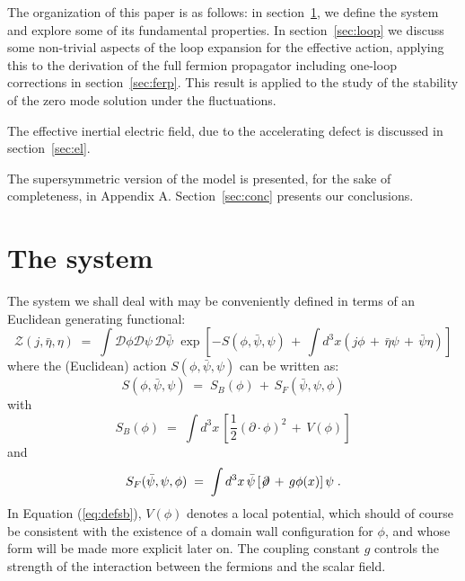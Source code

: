 \documentclass[a4paper,12pt]{article}
\begin{document}
The organization of this paper is as follows: in
section~\ref{sec:thesyst}, we define the system and explore some of
its fundamental properties. In section~\ref{sec:loop} we discuss some
non-trivial aspects of the loop expansion for the effective action,
applying this to the derivation of the full fermion propagator
including one-loop corrections in section~\ref{sec:ferp}. This result is
applied to the study of the stability of the zero mode solution under the
fluctuations. 

The effective inertial electric field, due to the accelerating defect
is discussed in section~\ref{sec:el}.

The supersymmetric version of the model is presented, for the sake of
completeness, in Appendix A. 
Section~\ref{sec:conc} presents our conclusions.

\section{The system}\label{sec:thesyst}
The system we shall deal with may be conveniently defined in terms of an 
Euclidean generating functional:
\begin{equation}
  \label{eq:defzgen}
{\mathcal Z}(j, {\bar\eta}, \eta) \;=\; \int {\mathcal D}\phi {\mathcal D}\psi \, 
{\mathcal D}{\bar\psi} \; \exp [ - S(\phi,{\bar\psi},\psi )\,+\,
\int d^3x (j\phi\,+\,{\bar\eta}\psi\,+\,{\bar\psi}\eta )]
\end{equation}
where the (Euclidean) action $S(\phi,{\bar\psi},\psi)$ can be written as:
\begin{equation}
  \label{eq:defs}
S(\phi,{\bar\psi},\psi)\;=\; S_B (\phi) \,+\, S_F ({\bar\psi},\psi,\phi)  
\end{equation}
with
\begin{equation}
  \label{eq:defsb}
S_B(\phi) \;=\; \int d^3x \,[\frac{1}{2} (\partial \cdot \phi)^2  \,+\, V(\phi) ]
\end{equation}
and
\begin{equation}
  \label{eq:defsf}
S_F({\bar\psi},\psi,\phi) \;=\; \int d^3x \,{\bar\psi}\,[\not\!\partial
\,+\, g \phi (x) ] \,\psi \;.
\end{equation} 
In Equation (\ref{eq:defsb}), $V(\phi)$ denotes a local potential,
which should of course be consistent with the existence of a domain
wall configuration for $\phi$, and whose form will be made more
explicit later on. The coupling constant $g$ controls the strength of
the interaction between the fermions and the scalar field.
\end{document}
